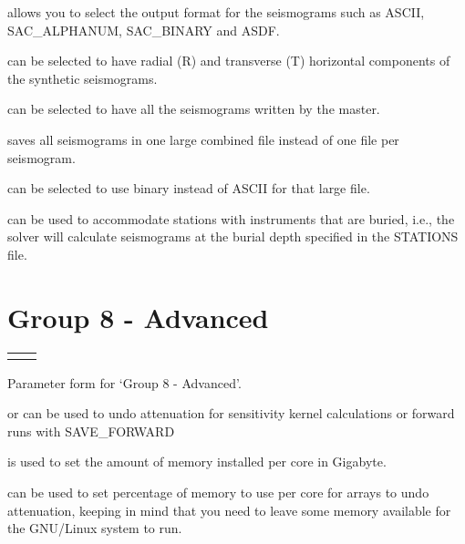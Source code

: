 \documentclass[english]{book}
\begin{document}
 allows you to select the output format for
the seismograms such as ASCII, SAC\_ALPHANUM, SAC\_BINARY and ASDF.

 can be selected to have radial (R) and
transverse (T) horizontal components of the synthetic seismograms.

 can be selected to have all the
seismograms written by the master.

 saves all seismograms in one large
combined file instead of one file per seismogram.

 can be selected to use binary instead
of ASCII for that large file.

 can be used to accommodate stations with
instruments that are buried, i.e., the solver will calculate seismograms
at the burial depth specified in the STATIONS file.


\section{Group 8 - Advanced}
\label{\detokenize{Appendix2:a2-9-group-8-advanced}}

\begin{savenotes}\sphinxattablestart
\centering
\begin{tabulary}{\linewidth}[t]{T T}


&
\\
\end{tabulary}
\par
\sphinxattableend\end{savenotes}

\begin{center} Parameter form for ‘Group 8 - Advanced’.
\end{center}
 or  can be used
to undo attenuation for sensitivity kernel calculations or forward runs
with SAVE\_FORWARD

 is used to set the amount of
memory installed per core in Gigabyte.

 can be used to set percentage
of memory to use per core for arrays to undo attenuation, keeping in
mind that you need to leave some memory available for the GNU/Linux
system to run.
\end{document}
